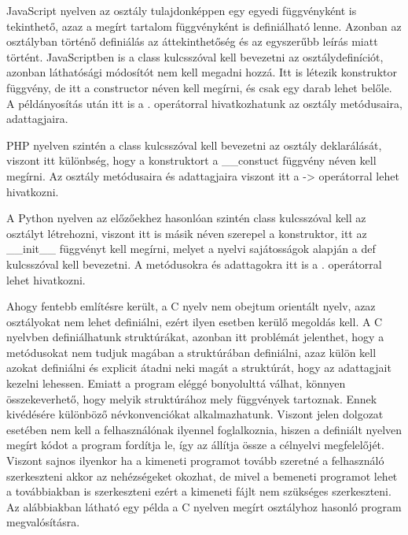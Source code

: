 JavaScript nyelven az osztály tulajdonképpen egy egyedi függvényként is tekinthető, azaz a megírt tartalom függvényként is definiálható lenne. Azonban az osztályban történő definiálás az áttekinthetőség és az egyszerűbb leírás miatt történt. JavaScriptben is a class kulcsszóval kell bevezetni az osztálydefiníciót, azonban láthatósági módosítót nem kell megadni hozzá. Itt is létezik konstruktor függvény, de itt a constructor néven kell megírni, és csak egy darab lehet belőle. A példányosítás után itt is a . operátorral hivatkozhatunk az osztály metódusaira, adattagjaira.

PHP nyelven szintén a class kulcsszóval kell bevezetni az osztály deklarálását, viszont itt különbség, hogy a konstruktort a \_\_constuct függvény néven kell megírni. Az osztály metódusaira és adattagjaira viszont itt a -> operátorral lehet hivatkozni.

A Python nyelven az előzőekhez hasonlóan szintén class kulcsszóval kell az osztályt létrehozni, viszont itt is másik néven szerepel a konstruktor, itt az \_\_init\_\_ függvényt kell megírni, melyet a nyelvi sajátosságok alapján a def kulcsszóval kell bevezetni. A metódusokra és adattagokra itt is a . operátorral lehet hivatkozni.

Ahogy fentebb említésre került, a C nyelv nem obejtum orientált nyelv, azaz osztályokat nem lehet definiálni, ezért ilyen esetben kerülő megoldás kell. A C nyelvben definiálhatunk struktúrákat, azonban itt problémát jelenthet, hogy a metódusokat nem tudjuk magában a struktúrában definiálni, azaz külön kell azokat definiálni és explicit átadni neki magát a struktúrát, hogy az adattagjait kezelni lehessen. Emiatt a program eléggé bonyolulttá válhat, könnyen összekeverhető, hogy melyik struktúrához mely függvények tartoznak. Ennek kivédésére különböző névkonvenciókat alkalmazhatunk. Viszont jelen dolgozat esetében nem kell a felhasználónak ilyennel foglalkoznia, hiszen a definiált nyelven megírt kódot a program fordítja le, így az állítja össze a célnyelvi megfelelőjét. Viszont sajnos ilyenkor ha a kimeneti programot tovább szeretné a felhasználó szerkeszteni akkor az nehézségeket okozhat, de mivel a bemeneti programot lehet a továbbiakban is szerkeszteni ezért a kimeneti fájlt nem szükséges szerkeszteni.
Az alábbiakban látható egy példa a C nyelven megírt osztályhoz hasonló program megvalósításra.

